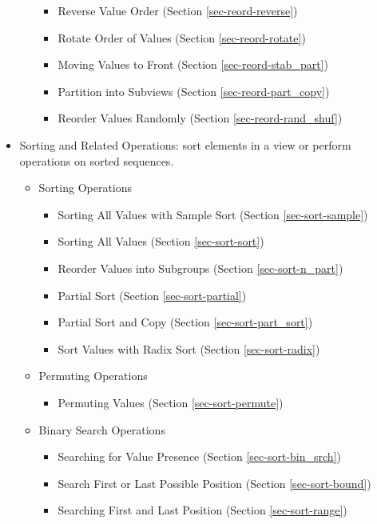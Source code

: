 \begin{itemize}
\begin{itemize}
\begin{itemize}
\item 
Reverse Value Order (Section \ref{sec-reord-reverse})
\item 
Rotate Order of Values (Section \ref{sec-reord-rotate})
\item 
Moving Values to Front (Section \ref{sec-reord-stab_part})
\item 
Partition into Subviews (Section \ref{sec-reord-part_copy})
\item 
Reorder Values Randomly (Section \ref{sec-reord-rand_shuf})
\end{itemize}

\end{itemize}

\item 
Sorting and Related Operations:
sort elements in a view or perform operations on sorted sequences.

\begin{itemize}
\item
Sorting Operations 

\begin{itemize}
\item 
Sorting All Values with Sample Sort (Section \ref{sec-sort-sample})
\item 
Sorting All Values (Section \ref{sec-sort-sort})
\item 
Reorder Values into Subgroups (Section \ref{sec-sort-n_part})
\item 
Partial Sort (Section \ref{sec-sort-partial})
\item 
Partial Sort and Copy (Section \ref{sec-sort-part_sort})
\item 
Sort Values with Radix Sort (Section \ref{sec-sort-radix})
\end{itemize}

\item 
Permuting Operations 

\begin{itemize}
\item 
Permuting Values (Section \ref{sec-sort-permute})
\end{itemize}

\item 
Binary Search Operations

\begin{itemize}
\item 
Searching for Value Presence (Section \ref{sec-sort-bin_srch})
\item 
Search First or Last Possible Position (Section \ref{sec-sort-bound})
\item 
Searching First and Last Position (Section \ref{sec-sort-range})
\end{itemize}


\end{itemize}
\end{itemize}
